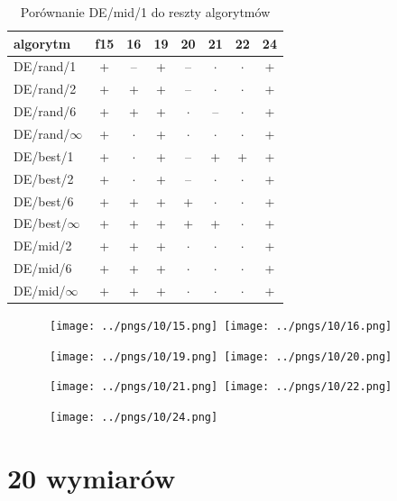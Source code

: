 \documentclass[a4paper,onecolumn,oneside,11pt,wide,floatssmall]{mwrep}
\theoremstyle{definition}
\theoremstyle{plain}%
\theoremstyle{remark}
\begin{document}
\begin{table}[H]
\centering
\begin{tabular}{ l | c | c | c | c | c | c | c }
algorytm         &f15& 16& 19& 20& 21& 22& 24 \\ \hline
DE/rand/1	 & + & -- & + & -- & $\cdot$ & $\cdot$ & + \\
DE/rand/2	 & + & + & + & -- & $\cdot$ & $\cdot$ & + \\
DE/rand/6	 & + & + & + & $\cdot$ & -- & $\cdot$ & + \\
DE/rand/$\infty$	 & + & $\cdot$ & + & $\cdot$ & $\cdot$ & $\cdot$ & + \\
DE/best/1	 & + & $\cdot$ & + & -- & + & + & + \\
DE/best/2	 & + & $\cdot$ & + & -- & $\cdot$ & $\cdot$ & + \\
DE/best/6	 & + & + & + & + & $\cdot$ & $\cdot$ & + \\
DE/best/$\infty$	 & + & + & + & + & + & $\cdot$ & + \\
DE/mid/2	 & + & + & + & $\cdot$ & $\cdot$ & $\cdot$ & + \\
DE/mid/6	 & + & + & + & $\cdot$ & $\cdot$ & $\cdot$ & + \\
DE/mid/$\infty$	 & + & + & + & $\cdot$ & $\cdot$ & $\cdot$ & + \\
\end{tabular}
\caption{Porównanie DE/mid/1 do reszty algorytmów}
\end{table}

\begin{figure}[H]
\centering
\mbox{
\texttt{[image: ../pngs/10/15.png]} \quad
\texttt{[image: ../pngs/10/16.png]} 
}
\end{figure}

\begin{figure}[H]
\centering
\mbox{
\texttt{[image: ../pngs/10/19.png]} \quad
\texttt{[image: ../pngs/10/20.png]} 
}
\end{figure}

\begin{figure}[H]
\centering
\mbox{
\texttt{[image: ../pngs/10/21.png]} \quad
\texttt{[image: ../pngs/10/22.png]} 
}
\end{figure}

\begin{figure}[H]
\centering
\mbox{
\texttt{[image: ../pngs/10/24.png]}
}
\end{figure}

\section{20 wymiarów}
\end{document}
